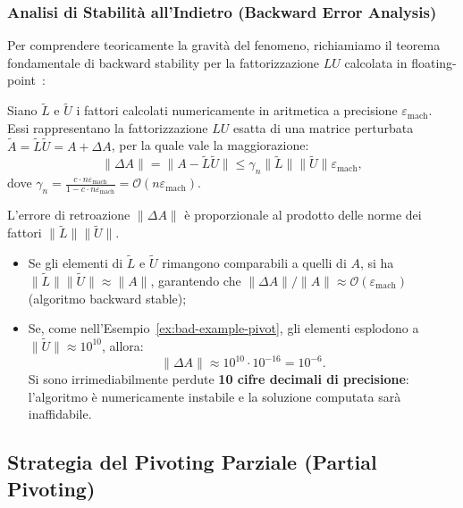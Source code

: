 \subsubsection{Analisi di Stabilit\`a all'Indietro (Backward Error Analysis)}
Per comprendere teoricamente la gravit\`a del fenomeno, richiamiamo il teorema fondamentale di backward stability per la fattorizzazione $LU$ calcolata in floating-point~\cite{golub2013matrix,higham2002accuracy}:
\begin{theorem}
Siano $\tilde{L}$ e $\tilde{U}$ i fattori calcolati numericamente in aritmetica a precisione $\varepsilon_{\mathrm{mach}}$. Essi rappresentano la fattorizzazione $LU$ esatta di una matrice perturbata $\tilde{A} = \tilde{L}\tilde{U} = A + \Delta A$, per la quale vale la maggiorazione:
\begin{equation}
    \|\Delta A\| = \|A - \tilde{L}\tilde{U}\| \le \gamma_n \|\tilde{L}\| \|\tilde{U}\| \varepsilon_{\mathrm{mach}},
    \label{eq:backward-error-lu}
\end{equation}
dove $\gamma_n = \frac{c \cdot n \varepsilon_{\mathrm{mach}}}{1 - c \cdot n \varepsilon_{\mathrm{mach}}} = \mathcal{O}(n \varepsilon_{\mathrm{mach}})$.
\end{theorem}

L'errore di retroazione $\|\Delta A\|$ \`e proporzionale al prodotto delle norme dei fattori $\|\tilde{L}\| \|\tilde{U}\|$.
\begin{itemize}
    \item Se gli elementi di $\tilde{L}$ e $\tilde{U}$ rimangono comparabili a quelli di $A$, si ha $\|\tilde{L}\| \|\tilde{U}\| \approx \|A\|$, garantendo che $\|\Delta A\| / \|A\| \approx \mathcal{O}(\varepsilon_{\mathrm{mach}})$ (algoritmo backward stable);
    \item Se, come nell'Esempio~\ref{ex:bad-example-pivot}, gli elementi esplodono a $\|\tilde{U}\| \approx 10^{10}$, allora:
    \begin{equation}
        \|\Delta A\| \approx 10^{10} \cdot 10^{-16} = 10^{-6}.
    \end{equation}
    Si sono irrimediabilmente perdute \textbf{10 cifre decimali di precisione}: l'algoritmo \`e numericamente instabile e la soluzione computata sar\`a inaffidabile.
\end{itemize}

\subsection{Strategia del Pivoting Parziale (Partial Pivoting)}
\label{subsec:pivoting-parziale}

